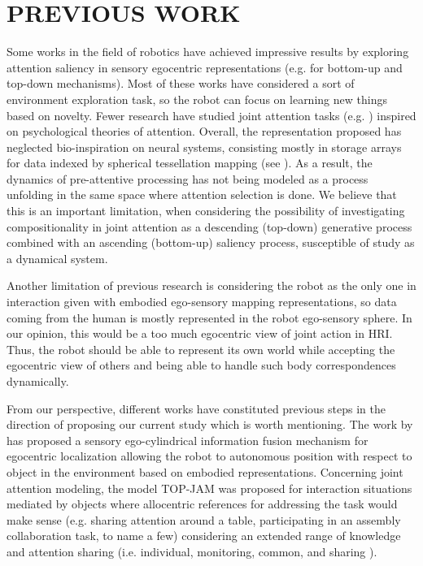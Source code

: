 \documentclass[letterpaper, 10 pt, conference]{ieeeconf}  %
\begin{document}
	
	
	\section{PREVIOUS WORK}
	\label{sec:previous}
	

	Some works in the field of robotics have achieved impressive results by exploring attention saliency in sensory egocentric representations (e.g. for bottom-up \cite{ruesch2008} and top-down \cite{bodiroza2011} mechanisms). Most of these works have considered a sort of environment exploration task, so the robot can focus on learning new things based on novelty. Fewer research have studied joint attention tasks (e.g. \cite{bodiroza2011}) inspired on psychological theories of attention. Overall, the representation proposed has neglected bio-inspiration on neural systems, consisting mostly in storage arrays for data indexed by spherical tessellation mapping (see \cite{peters2009sensory}). As a result, the dynamics of pre-attentive processing has not being modeled as a process unfolding in the same space where attention selection is done. We believe that this is an important limitation, when considering the possibility of investigating compositionality in joint attention as a descending (top-down) generative process combined with an ascending (bottom-up) saliency process, susceptible of study as a dynamical system.   
	
	Another limitation of previous research is considering the robot as the only one in interaction given with embodied ego-sensory mapping representations, so data coming from the human is mostly represented in the robot ego-sensory sphere. In our opinion, this would be a too much egocentric view of joint action in HRI. Thus, the robot should be able to represent its own world while accepting the egocentric view of others and being able to handle such body correspondences dynamically. 
	 
	From our perspective, different works have constituted previous steps in the direction of proposing our current study which is worth mentioning. The work by \cite{chame2016} has proposed a sensory ego-cylindrical information fusion mechanism for egocentric localization allowing the robot to autonomous position with respect to object in the environment based on embodied representations. Concerning joint attention modeling, the model TOP-JAM \cite{chame2023top} was proposed for interaction situations mediated by objects where allocentric references for addressing the task would make sense (e.g. sharing attention around a table, participating in an assembly collaboration task, to name a few) considering an extended range of knowledge and attention sharing (i.e. individual, monitoring, common, and sharing \cite{siposova2019}). 
	 
\end{document}
